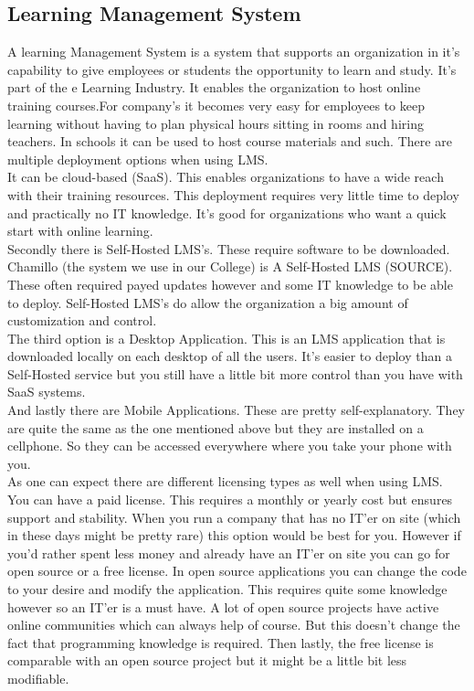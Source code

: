 \subsection{Learning Management System}
A learning Management System is a system that supports an organization in it's capability to give employees or students the opportunity to learn and study. It's part of the e Learning Industry. It enables the organization to host online training courses.For company's it becomes very easy for employees to keep learning without having to plan physical hours sitting in rooms and hiring teachers. In schools it can be used to host course materials and such. There are multiple deployment options when using LMS. \\
It can be cloud-based (SaaS). This enables organizations to have a wide reach with their training resources. This deployment requires very little time to deploy and practically no IT knowledge. It's good for organizations who want a quick start with online learning.\\
Secondly there is Self-Hosted LMS's. These require software to be downloaded. Chamillo (the system we use in our College) is A Self-Hosted LMS (SOURCE). These often required payed updates however and some IT knowledge to be able to deploy. Self-Hosted LMS's do allow the organization a big amount of customization and control.\\
The third option is a Desktop Application. This is an LMS application that is downloaded locally on each desktop of all the users. It's easier to deploy than a Self-Hosted service but you still have a little bit more control than you have with SaaS systems.\\
And lastly there are Mobile Applications. These are pretty self-explanatory. They are quite the same as the one mentioned above but they are installed on a cellphone. So they can be accessed everywhere where you take your phone with you.\\
As one can expect there are different licensing types as well when using LMS. You can have a paid license. This requires a monthly or yearly cost but ensures support and stability. When you run a company that has no IT'er on site (which in these days might be pretty rare) this option would be best for you. However if you'd rather spent less money and already have an IT'er on site you can go for open source or a free license. In open source applications you can change the code to your desire and modify the application. This requires quite some knowledge however so an IT'er is a must have. A lot of open source projects have active online communities which can always help of course. But this doesn't change the fact that programming knowledge is required. Then lastly, the free license is comparable with an open source project but it might be a little bit less modifiable.\\
